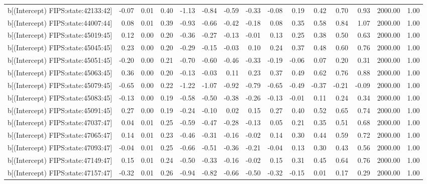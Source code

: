 \begin{table}[ht]
\begin{tabular}{rrrrrrrrrrrrrrr}
  b[(Intercept) FIPS:state:42133:42] & -0.07 & 0.01 & 0.40 & -1.13 & -0.84 & -0.59 & -0.33 & -0.08 & 0.19 & 0.42 & 0.70 & 0.93 & 2000.00 & 1.00 \\ 
  b[(Intercept) FIPS:state:44007:44] & 0.08 & 0.01 & 0.39 & -0.93 & -0.66 & -0.42 & -0.18 & 0.08 & 0.35 & 0.58 & 0.84 & 1.07 & 2000.00 & 1.00 \\ 
  b[(Intercept) FIPS:state:45019:45] & 0.12 & 0.00 & 0.20 & -0.36 & -0.27 & -0.13 & -0.01 & 0.13 & 0.25 & 0.38 & 0.50 & 0.63 & 2000.00 & 1.00 \\ 
  b[(Intercept) FIPS:state:45045:45] & 0.23 & 0.00 & 0.20 & -0.29 & -0.15 & -0.03 & 0.10 & 0.24 & 0.37 & 0.48 & 0.60 & 0.76 & 2000.00 & 1.00 \\ 
  b[(Intercept) FIPS:state:45051:45] & -0.20 & 0.00 & 0.21 & -0.70 & -0.60 & -0.46 & -0.33 & -0.19 & -0.06 & 0.07 & 0.20 & 0.31 & 2000.00 & 1.00 \\ 
  b[(Intercept) FIPS:state:45063:45] & 0.36 & 0.00 & 0.20 & -0.13 & -0.03 & 0.11 & 0.23 & 0.37 & 0.49 & 0.62 & 0.76 & 0.88 & 2000.00 & 1.00 \\ 
  b[(Intercept) FIPS:state:45079:45] & -0.65 & 0.00 & 0.22 & -1.22 & -1.07 & -0.92 & -0.79 & -0.65 & -0.49 & -0.37 & -0.21 & -0.09 & 2000.00 & 1.00 \\ 
  b[(Intercept) FIPS:state:45083:45] & -0.13 & 0.00 & 0.19 & -0.58 & -0.50 & -0.38 & -0.26 & -0.13 & -0.01 & 0.11 & 0.24 & 0.34 & 2000.00 & 1.00 \\ 
  b[(Intercept) FIPS:state:45091:45] & 0.27 & 0.00 & 0.19 & -0.24 & -0.10 & 0.02 & 0.15 & 0.27 & 0.40 & 0.52 & 0.65 & 0.74 & 2000.00 & 1.00 \\ 
  b[(Intercept) FIPS:state:47037:47] & 0.04 & 0.01 & 0.25 & -0.59 & -0.47 & -0.28 & -0.13 & 0.05 & 0.21 & 0.35 & 0.51 & 0.68 & 2000.00 & 1.00 \\ 
  b[(Intercept) FIPS:state:47065:47] & 0.14 & 0.01 & 0.23 & -0.46 & -0.31 & -0.16 & -0.02 & 0.14 & 0.30 & 0.44 & 0.59 & 0.72 & 2000.00 & 1.00 \\ 
  b[(Intercept) FIPS:state:47093:47] & -0.04 & 0.01 & 0.25 & -0.66 & -0.51 & -0.36 & -0.21 & -0.04 & 0.13 & 0.30 & 0.43 & 0.56 & 2000.00 & 1.00 \\ 
  b[(Intercept) FIPS:state:47149:47] & 0.15 & 0.01 & 0.24 & -0.50 & -0.33 & -0.16 & -0.02 & 0.15 & 0.31 & 0.45 & 0.64 & 0.76 & 2000.00 & 1.00 \\ 
  b[(Intercept) FIPS:state:47157:47] & -0.32 & 0.01 & 0.26 & -0.94 & -0.82 & -0.66 & -0.50 & -0.32 & -0.15 & 0.01 & 0.17 & 0.29 & 2000.00 & 1.00 \\ 

\end{tabular}
\end{table}
